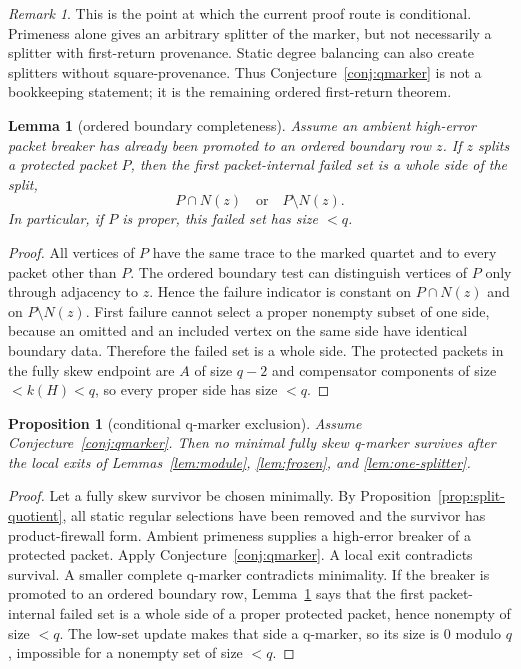 \documentclass[11pt]{article}
\newtheorem{lemma}[theorem]{Lemma}
\newtheorem{proposition}[theorem]{Proposition}
\theoremstyle{remark}
\newtheorem{remark}[theorem]{Remark}
\begin{document}
\begin{remark}
This is the point at which the current proof route is conditional.  Primeness
alone gives an arbitrary splitter of the marker, but not necessarily a splitter
with first-return provenance.  Static degree balancing can also create splitters
without square-provenance.  Thus Conjecture~\ref{conj:qmarker} is not a
bookkeeping statement; it is the remaining ordered first-return theorem.
\end{remark}

\begin{lemma}[ordered boundary completeness]\label{lem:boundary-complete}
Assume an ambient high-error packet breaker has already been promoted to an
ordered boundary row \(z\).  If \(z\) splits a protected packet \(P\), then the
first packet-internal failed set is a whole side of the split,
\[
  P\cap N(z)\quad\text{or}\quad P\setminus N(z).
\]
In particular, if \(P\) is proper, this failed set has size \(<q\).
\end{lemma}

\begin{proof}
All vertices of \(P\) have the same trace to the marked quartet and to every
packet other than \(P\).  The ordered boundary test can distinguish vertices of
\(P\) only through adjacency to \(z\).  Hence the failure indicator is constant
on \(P\cap N(z)\) and on \(P\setminus N(z)\).  First failure cannot select a
proper nonempty subset of one side, because an omitted and an included vertex on
the same side have identical boundary data.  Therefore the failed set is a whole
side.  The protected packets in the fully skew endpoint are \(A\) of size
\(q-2\) and compensator components of size \(<k(H)<q\), so every proper side has
size \(<q\).
\end{proof}

\begin{proposition}[conditional q-marker exclusion]\label{prop:conditional-marker}
Assume Conjecture~\ref{conj:qmarker}.  Then no minimal fully skew q-marker
survives after the local exits of Lemmas~\ref{lem:module},
\ref{lem:frozen}, and \ref{lem:one-splitter}.
\end{proposition}

\begin{proof}
Let a fully skew survivor be chosen minimally.  By
Proposition~\ref{prop:split-quotient}, all static regular selections have been
removed and the survivor has product-firewall form.  Ambient primeness supplies
a high-error breaker of a protected packet.  Apply
Conjecture~\ref{conj:qmarker}.  A local exit contradicts survival.  A smaller
complete q-marker contradicts minimality.  If the breaker is promoted to an
ordered boundary row, Lemma~\ref{lem:boundary-complete} says that the first
packet-internal failed set is a whole side of a proper protected packet, hence
nonempty of size \(<q\).  The low-set update makes that side a q-marker, so its
size is \(0\) modulo \(q\), impossible for a nonempty set of size \(<q\).
\end{proof}
\end{document}
